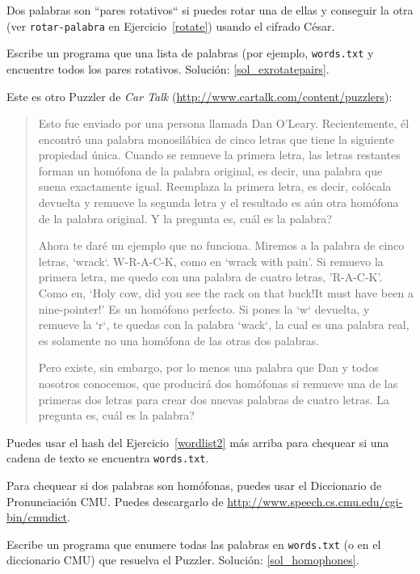 \begin{exercise}
\label{exrotatepairs}

Dos palabras son ``pares rotativos`` si puedes rotar una de ellas
y conseguir la otra (ver \verb"rotar-palabra" en 
Ejercicio~\ref{rotate}) usando el cifrado César.

Escribe un programa que una lista de palabras (por ejemplo, {\tt words.txt}
y encuentre todos los pares rotativos.
Solución: \ref{sol_exrotatepairs}.

\end{exercise}


\begin{exercise}
\label{homophones}

Este es otro Puzzler de {\em Car Talk} 
(\url{http://www.cartalk.com/content/puzzlers}):

\begin{quote}

Esto fue enviado por una persona llamada Dan O'Leary. Recientemente,
él encontró una palabra monosilábica de cinco letras que tiene la 
siguiente propiedad única. Cuando se remueve la primera letra, las 
letras restantes forman un homófona de la palabra original, es decir,
una palabra que suena exactamente igual. Reemplaza la primera letra,
es decir, colócala devuelta y remueve la segunda letra y el resultado
es aún otra homófona de la palabra original. Y la pregunta es, cuál es
la palabra?

Ahora te daré un ejemplo que no funciona. Miremos a la palabra de cinco
letras, `wrack`. W-R-A-C-K, como en `wrack with pain'. Si remuevo la primera
letra, me quedo con una palabra de cuatro letras, 'R-A-C-K'. Como en, 
`Holy cow, did you see the rack on that buck!It must have been a nine-pointer!' 
Es un homófono perfecto. Si pones la `w` devuelta, y remueve la `r`, te quedas
con la palabra `wack`, la cual es una palabra real, es solamente no una homófona de
las otras dos palabras.

Pero existe, sin embargo, por lo menos una palabra que Dan y todos
nosotros conocemos, que producirá dos homófonas si remueve una de las primeras
dos letras para crear dos nuevas palabras de cuatro letras. La pregunta es,
cuál es la palabra?
\end{quote}

Puedes usar el hash del Ejercicio~\ref{wordlist2} más arriba para
chequear si una cadena de texto se encuentra {\tt words.txt}.

Para chequear si dos palabras son homófonas, puedes usar el 
Diccionario de Pronunciación CMU. Puedes descargarlo de 
\url{http://www.speech.cs.cmu.edu/cgi-bin/cmudict}.

Escribe un programa que enumere todas las palabras en {\tt words.txt}
(o en el diccionario CMU) que resuelva el Puzzler.
Solución: \ref{sol_homophones}.

\end{exercise}


